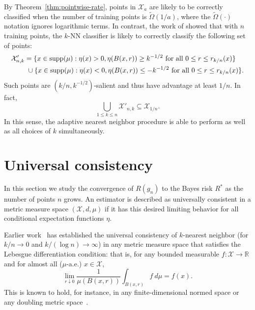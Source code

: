 \documentclass{article}
\def\R{{\mathbb{R}}}
\def\X{{\mathcal X}}
\def\supp{{\rm supp}}
\begin{document}
By Theorem~\ref{thm:pointwise-rate}, points in $\X_a$ are likely to be correctly classified when the number of training points is $\widetilde{\Omega}(1/a)$, where the $\widetilde{\Omega}(\cdot)$ notation ignores logarithmic terms.
In contrast, the work of \cite{ChaudhuriDasgupta2014} showed that with $n$ training points, the $k$-NN classifier is likely to correctly classify the following set of points:
\begin{align*}
\X'_{n,k} &= \{x \in \supp(\mu): \eta(x) > 0, \eta(B(x,r)) \geq k^{-1/2} \mbox{\ for all $0 \leq r \leq r_{k/n}(x)$}\} \\
&\ \cup \{x \in \supp(\mu): \eta(x) < 0, \eta(B(x,r)) \leq -k^{-1/2} \mbox{\ for all $0 \leq r \leq r_{k/n}(x)$}\} .
\end{align*}
Such points are $(k/n, k^{-1/2})$-salient and thus have advantage at least $1/n$. In fact,
$$ \bigcup_{1 \leq k \leq n} \X'_{n,k} \subseteq \X_{1/n} .$$
In this sense, the adaptive nearest neighbor procedure is able to perform as well as all choices of $k$ simultaneously.

\section{Universal consistency}
\label{sec:universal-consistency}

In this section we study the convergence of $R(g_n)$ to the Bayes risk $R^*$ as the number of points $n$ grows. An estimator is described as universally consistent in a metric measure space $(\X, d, \mu)$ if it has this desired limiting behavior for all conditional expectation functions $\eta$.

Earlier work~\cite{ChaudhuriDasgupta2014} has established the universal consistency of $k$-nearest neighbor (for $k/n \rightarrow 0$ and $k/(\log n) \rightarrow \infty$) in any metric measure space that satisfies the Lebesgue differentiation condition: that is, for any bounded measurable $f: \X \rightarrow \R$ and for almost all ($\mu$-a.e.) $x \in \X$,
\begin{equation}
\lim_{r \downarrow 0} \frac{1}{\mu(B(x,r))} \int_{B(x,r)} f \ d\mu = f(x) .
\label{eq:lebesgue-condition}
\end{equation}
This is known to hold, for instance, in any finite-dimensional normed space or any doubling metric space~\cite[Chapter 1]{H01}.
\end{document}
